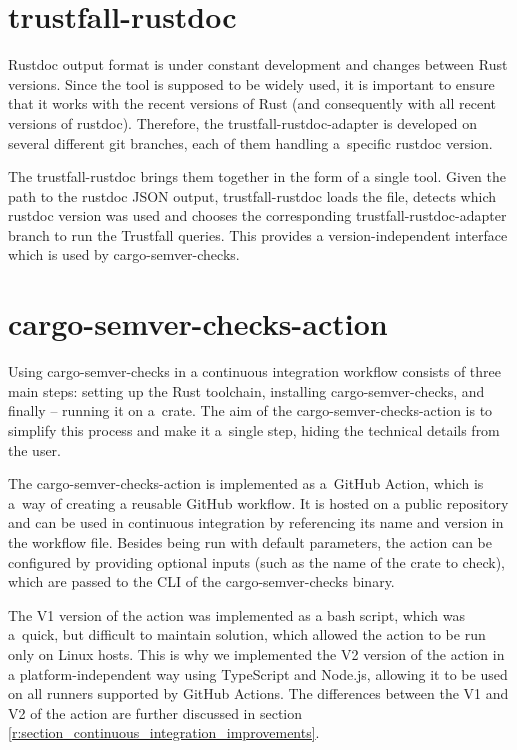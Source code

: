 \documentclass[licencjacka,en]{pracamgr}
\begin{document}
\section{trustfall-rustdoc}\label{r:section_trustfall_rustdoc}

Rustdoc output format is under constant development and changes between Rust versions.
Since the tool is supposed to be widely used, it is important to ensure that it works with
the recent versions of Rust (and consequently with all recent versions of rustdoc).
Therefore, the trustfall-rustdoc-adapter is developed on several different git branches,
each of them handling a~specific rustdoc version.

The trustfall-rustdoc brings them together in the form of a single tool. Given the path to
the rustdoc JSON output, trustfall-rustdoc loads the file, detects which rustdoc version was used
and chooses the corresponding trustfall-rustdoc-adapter branch to run the Trustfall queries.
This provides a version-independent interface which is used by cargo-semver-checks.

\section{cargo-semver-checks-action}\label{r:section_cargo_semver_checks_action}

Using cargo-semver-checks in a continuous integration workflow consists of three main steps:
setting up the Rust toolchain, installing cargo-semver-checks, and finally -- running it on a~crate.
The aim of the cargo-semver-checks-action is to simplify this process and make it a~single step,
hiding the technical details from the user.

The cargo-semver-checks-action is implemented as a~GitHub Action, which is a~way of creating
a reusable GitHub workflow. It is hosted on a public repository and can be used in continuous
integration by referencing its name and version in the workflow file. Besides being run with default
parameters, the action can be configured by providing optional inputs (such as the name of the crate
to check), which are passed to the CLI of the cargo-semver-checks binary.

The V1 version of the action was implemented as a bash script, which was a~quick, but difficult
to maintain solution, which allowed the action to be run only on Linux hosts. This is why
we implemented the V2 version of the action in a platform-independent way using TypeScript
and Node.js, allowing it to be used on all runners supported by GitHub Actions.
The differences between the V1 and V2 of the action are further discussed in section
\ref{r:section_continuous_integration_improvements}.
\end{document}

